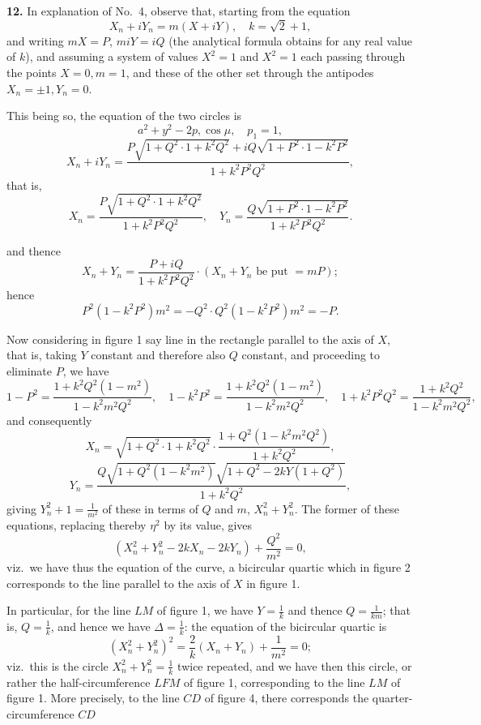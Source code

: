 \documentclass[11pt,a4paper]{book}
\begin{document}
\textbf{12.} In explanation of No.\ 4, observe that, starting from the equation
\[
X_n + iY_n = m(X + iY), \quad k = \sqrt{2} + 1,
\]
and writing $m X = P$, $m i Y = i Q$ (the analytical formula obtains for any real value of $k$), and assuming a system of values $X^2 = 1$ and $X^2 = 1$ each passing through the points $X = 0, m = 1$, and these of the other set through the antipodes $X_n = \pm 1, Y_n = 0$.

This being so, the equation of the two circles is
\[
a^2 + y^2 - 2p, \cos \mu, \quad p_1 = 1,
\]
\[
X_n + iY_n = \frac{P \sqrt{1 + Q^2 \cdot 1 + k^2 Q^2} + iQ \sqrt{1 + P^2 \cdot 1 - k^2 P^2}}{1 + k^2 P^2 Q^2},
\]
that is,
\[
X_n = \frac{P \sqrt{1 + Q^2 \cdot 1 + k^2 Q^2}}{1 + k^2 P^2 Q^2}, \quad Y_n = \frac{Q \sqrt{1 + P^2 \cdot 1 - k^2 P^2}}{1 + k^2 P^2 Q^2}.
\]

and thence
\[
X_n + Y_n = \frac{P + iQ}{1 + k^2 P^2 Q^2} \cdot (X_n + Y_n \text{ be put } = mP);
\]
hence
\[
P^2 (1 - k^2 P^2) m^2 = -Q^2 \cdot Q^2 (1 - k^2 P^2) m^2 = - P.
\]

Now considering in figure 1 say line in the rectangle parallel to the axis of $X$, that is, taking $Y$ constant and therefore also $Q$ constant, and proceeding to eliminate $P$, we have
\[
1 - P^2 = \frac{1 + k^2 Q^2 (1 - m^2)}{1 - k^2 m^2 Q^2}, \quad 1 - k^2 P^2 = \frac{1 + k^2 Q^2 (1 - m^2)}{1 - k^2 m^2 Q^2}, \quad 1 + k^2 P^2 Q^2 = \frac{1 + k^2 Q^2}{1 - k^2 m^2 Q^2},
\]
and consequently
\[
X_n = \sqrt{1 + Q^2 \cdot 1 + k^2 Q^2} \cdot \frac{1 + Q^2 (1 - k^2 m^2 Q^2)}{1 + k^2 Q^2},
\]
\[
Y_n = \frac{Q \sqrt{1 + Q^2(1 - k^2 m^2)} \sqrt{1 + Q^2 - 2 k Y (1 + Q^2)}}{1 + k^2 Q^2},
\]
giving $Y_n^2 + 1 = \frac{1}{m^2}$ of these in terms of $Q$ and $m$, $X_n^2 + Y_n^2$. The former of these equations, replacing thereby $\eta^2$ by its value, gives
\[
(X_n^2 + Y_n^2 - 2k X_n - 2 k Y_n) + \frac{Q^2}{m^2} = 0,
\]
viz.\ we have thus the equation of the curve, a bicircular quartic which in figure 2 corresponds to the line parallel to the axis of $X$ in figure 1.

In particular, for the line $LM$ of figure 1, we have $Y = \frac{1}{k}$ and thence $Q = \frac{1}{km}$; that is, $Q = \frac{1}{k}$, and hence we have $\Delta = \frac{1}{k}$: the equation of the bicircular quartic is
\[
(X_n^2 + Y_n^2)^2 = \frac{2}{k} (X_n + Y_n) + \frac{1}{m^2} = 0;
\]
viz.\ this is the circle $X_n^2 + Y_n^2 = \frac{1}{k}$ twice repeated, and we have then this circle, or rather the half-circumference $LFM$ of figure 1, corresponding to the line $LM$ of figure 1. More precisely, to the line $CD$ of figure 4, there corresponds the quarter-circumference $CD$
\end{document}

